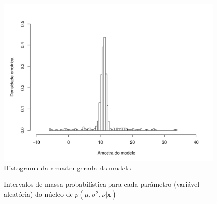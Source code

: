 \documentclass[9pt]{beamer}
\begin{document}
\begin{frame}
\begin{figure}[htb]
\centering
\includegraphics[scale=0.5]{figuras/amostra_n.pdf}
\caption{Histograma da amostra gerada do modelo}
\label{fig:sample_n.pdf}
\end{figure}
\end{frame}
\begin{frame}
\begin{figure}[htb]\footnotesize
\centering
{}%
\caption{Intervalos de massa probabilística para cada parâmetro (variável aleatória) do núcleo de $p(\mu, \sigma^2, \nu | \bm{x})$}%
\end{figure}
\end{frame}
\end{document}
